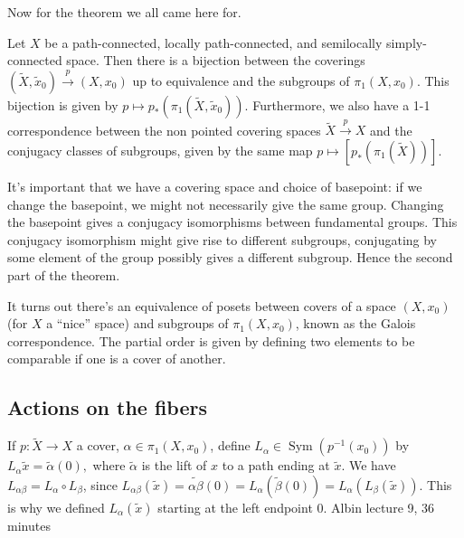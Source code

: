 Now for the theorem we all came here for.
\begin{theorem}\label{galois}
    Let $X$ be a path-connected, locally path-connected, and semilocally simply-connected space. Then there is a bijection between the coverings $(\widetilde X,\widetilde x_0) \overset{p}{\to }(X,x_0)$ up to equivalence and the subgroups of $\pi_1(X,x_0)$. This bijection is given by $p \mapsto p_*(\pi_1(\widetilde X,\widetilde x_0))$. Furthermore, we also have a 1-1 correspondence between the non pointed covering spaces $\widetilde X \overset{p}{\to }X$ and the conjugacy classes of subgroups, given by the same map  $p\mapsto [p_*(\pi_1(\widetilde X))]$.
\end{theorem}
It's important that we have a covering space and choice of basepoint: if we change the basepoint, we might not necessarily give the same group. Changing the basepoint gives a conjugacy isomorphisms between fundamental groups. This conjugacy isomorphism might give rise to different subgroups, conjugating by some element of the group possibly gives a different subgroup. Hence the second part of the theorem.

It turns out there's an equivalence of posets between covers of a space $(X,x_0)$ (for $X$ a ``nice'' space) and subgroups of $\pi_1(X,x_0)$, known as the Galois correspondence. The partial order is given by defining two elements to be comparable if one is a cover of another.
\subsection{Actions on the fibers}
If $p \colon \widetilde X \to X$ a cover, $\alpha \in \pi_1(X,x_0)$, define $L_{\alpha }\in \operatorname{Sym}(p^{-1}(x_0))$ by $L_{\alpha}\widetilde x=\widetilde \alpha (0),$ where $\widetilde \alpha $ is the lift of $x$ to a path ending at $\widetilde x$. We have $L_{\alpha \beta }=L_{\alpha }\circ L_{\beta }$, since $L_{\alpha \beta }(\widetilde x)=\widetilde{\alpha \beta }(0)=L_{\alpha }(\widetilde \beta(0))=L_{\alpha }(L_{\beta }(\widetilde x)).  $ This is why we defined $L_{\alpha }(\widetilde x)$ starting at the left endpoint $0$. Albin lecture 9, 36 minutes

